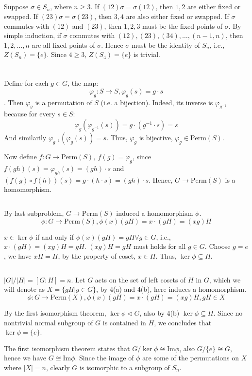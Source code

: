\documentclass[12pt]{article}
\begin{document}
\subsection{}
Suppose $\sigma\in S_n$, where $n\ge 3$. If $(12)\sigma=\sigma(12)$, then $1,2$ are either fixed or swapped. If $(23)\sigma=\sigma(23)$, then $3,4$ are also either fixed or swapped. If $\sigma$ commutes with $(12)$ and $(23)$, then $1,2,3$ must be the fixed points of $\sigma$. By simple induction, if $\sigma$ commutes with $(12),(23),(34),\dots,(n-1,n)$, then $1,2,\dots,n$ are all fixed points of $\sigma$. Hence $\sigma$ must be the identity of $S_n$, i.e., $Z(S_n)=\{e\}$. Since $4\ge3$, $Z(S_4)=\{e\}$ is trivial.


\section{}
\subsection{}
Define for each $g\in G$, the map:
$$\varphi_g: S\rightarrow S,\varphi_g(s)=g\cdot s$$. Then $\varphi_g$ is a permutation of $S$ (i.e. a bijection). Indeed, its inverse is $\varphi_{g^{-1}}$ because for every $s\in S$:
$$\varphi_g(\varphi_{g^{-1}}(s))=g\cdot(g^{-1}\cdot s)=s$$
And similarily $\varphi_{g^{-1}}(\varphi_{g}(s))=s$. Thus, $\varphi_g$ is bijective, $\varphi_g\in \mathrm{Perm}(S)$. 

Now define $f:G\rightarrow \mathrm{Perm}(S),\ f(g)=\varphi_g$, since $f(gh)(s)=\varphi_{gh}(s)=(gh)\cdot s$ and $(f(g)\circ f(h))(s)=g\cdot (h\cdot s)=(gh)\cdot s$. Hence, $G\rightarrow \mathrm{Perm}(S)$ is a homomorphism.

\subsection{}
By last subproblem, $G\rightarrow\mathrm{Perm}(S)$ induced a homomorphism $\phi$.
$$\phi:G\rightarrow\mathrm{Perm}(S),\phi(x)(gH)=x\cdot(gH)=(xg)H$$

$x\in\ker{\phi}$ if and only if $\phi(x)(gH)=gH\forall g\in G$, i.e., $x\cdot(gH)=(xg)H=gH$. $(xg)H=gH$ must holds for all $g\in G$. Choose $g=e$, we have $xH=H$, by the property of coset, $x\in H$. Thus, $\ker{\phi}\subseteq H$.

\subsection{}
$|G|/|H|=[G:H]=n$. Let $G$ acts on the set of left cosets of $H$ in $G$, which we will denote as $X=\{gH|g\in G\}$, by 4(a) and 4(b), here induces a homomorphism.
$$\phi:G\rightarrow\mathrm{Perm}(X),\phi(x)(gH)=x\cdot(gH)=(xg)H,gH\in X$$

By the first isomorphism theorem, $\ker{\phi}\triangleleft G$, also by 4(b) $\ker{\phi}\subseteq H$. Since no nontrivial normal subgroup of $G$ is contained in $H$, we concludes that $\ker\phi=\{e\}$.

The first isomorphism theorem states that $G/\ker{\phi}\cong\mathrm{Im}{\phi}$, also $G/\{e\}\cong G$, hence we have $G\cong\mathrm{Im}{\phi}$. Since the image of $\phi$ are some of the permutations on $X$ where $|X|=n$, clearly $G$ is isomorphic to a subgroup of $S_n$.
\end{document}
